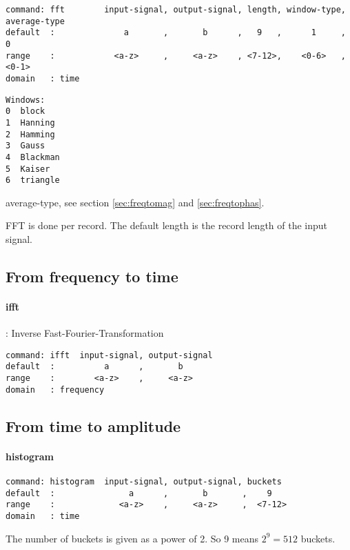 \documentclass{report}
\newcommand{\bc}{\scriptsize}
\newcommand{\ec}{\normalsize}
\begin{document}
\bc
\begin{verbatim}
command: fft        input-signal, output-signal, length, window-type, average-type
default  :              a       ,       b      ,   9   ,      1     ,      0
range    :            <a-z>     ,     <a-z>    , <7-12>,    <0-6>   ,    <0-1>
domain   : time
\end{verbatim}
\ec

\begin{verbatim}
Windows:
0  block
1  Hanning
2  Hamming
3  Gauss
4  Blackman
5  Kaiser
6  triangle
\end{verbatim}

average-type, see section \ref{sec:freqtomag} and \ref{sec:freqtophas}.

FFT is done per record. The default length is the record length of the input signal.

\subsection{From frequency to time}

\paragraph{ifft}: Inverse Fast-Fourier-Transformation

\bc
\begin{verbatim}
command: ifft  input-signal, output-signal
default  :          a      ,       b
range    :        <a-z>    ,     <a-z>
domain   : frequency
\end{verbatim}
\ec

\subsection{From time to amplitude}

\paragraph{histogram}

\bc
\begin{verbatim}
command: histogram  input-signal, output-signal, buckets
default  :               a      ,       b       ,    9
range    :             <a-z>    ,     <a-z>     ,  <7-12>
domain   : time
\end{verbatim}
\ec

The number of buckets is given as a power of 2. So 9 means $2^9=512$ buckets.
\end{document}
